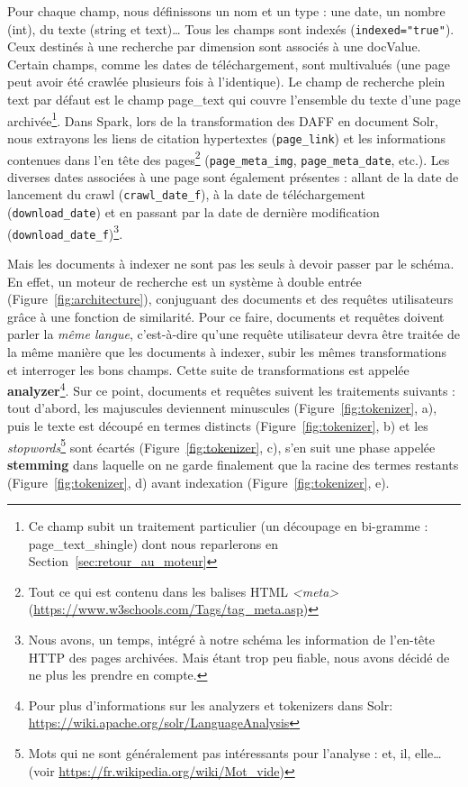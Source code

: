 \documentclass[symmetric,justified,marginals=raggedouter]{tufte-book}
\begin{document}
\noindent Pour chaque champ, nous définissons un nom et un type : une date, un nombre (int), du texte (string et text)\ldots{} Tous les champs sont indexés (\texttt{indexed="true"}). Ceux destinés à une recherche par dimension sont associés à une docValue. Certain champs, comme les dates de téléchargement, sont multivalués (une page peut avoir été crawlée plusieurs fois à l'identique). Le champ de recherche plein text par défaut est le champ page\_text qui couvre l'ensemble du texte d'une page archivée\footnote{\RaggedOuter Ce champ subit un traitement particulier (un découpage en bi-gramme : page\_text\_shingle) dont nous reparlerons en Section~\ref{sec:retour_au_moteur}}. Dans Spark, lors de la transformation des DAFF en document Solr, nous extrayons les liens de citation hypertextes (\texttt{page\_link}) et les informations contenues dans l'en tête des pages\footnote{\RaggedOuter Tout ce qui est contenu dans les balises HTML \textit{<meta>} (\url{https://www.w3schools.com/Tags/tag_meta.asp})} (\texttt{page\_meta\_img}, \texttt{page\_meta\_date}, etc.). Les diverses dates associées à une page sont également présentes : allant de la date de lancement du crawl (\texttt{crawl\_\-date\_f}), à la date de téléchargement (\texttt{download\_date}) et en passant par la date de dernière modification (\texttt{download\_date\_f})\footnote{\RaggedOuter Nous avons, un temps, intégré à notre schéma les information de l'en-tête HTTP des pages archivées. Mais étant trop peu fiable, nous avons décidé de ne plus les prendre en compte.}.

Mais les documents à indexer ne sont pas les seuls à devoir passer par le schéma. En effet, un moteur de recherche est un système à double entrée (Figure~\ref{fig:architecture}), conjuguant des documents et des requêtes utilisateurs grâce à une fonction de similarité. Pour ce faire, documents et requêtes doivent parler la \textit{même langue}, c'est-à-dire qu'une requête utilisateur devra être traitée de la même manière que les documents à indexer, subir les mêmes transformations et interroger les bons champs. Cette suite de transformations est appelée \textbf{analyzer}\footnote{\RaggedOuter Pour plus d'informations sur les analyzers et tokenizers dans Solr: \url{https://wiki.apache.org/solr/LanguageAnalysis}}. Sur ce point, documents et requêtes suivent les traitements suivants : tout d'abord, les majuscules deviennent minuscules (Figure~\ref{fig:tokenizer}, a), puis le texte est découpé en termes distincts (Figure~\ref{fig:tokenizer}, b) et les \textit{stopwords}\footnote{\RaggedOuter Mots qui ne sont généralement pas intéressants pour l'analyse : et, il, elle\ldots{} (voir \url{https://fr.wikipedia.org/wiki/Mot_vide})} sont écartés (Figure~\ref{fig:tokenizer}, c), s'en suit une phase appelée \textbf{stemming} dans laquelle on ne garde finalement que la racine des termes restants (Figure~\ref{fig:tokenizer}, d) avant indexation (Figure~\ref{fig:tokenizer}, e).
\end{document}
